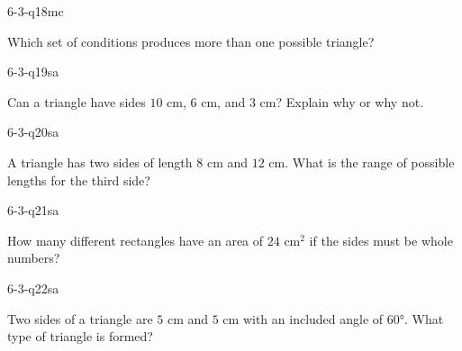\begin{practiceQuestion}{6-3-q18}{mc}
\begin{questionText}
Which set of conditions produces more than one possible triangle?
\end{questionText}
\end{practiceQuestion}


\begin{practiceQuestion}{6-3-q19}{sa}
\begin{questionText}
Can a triangle have sides $10$ cm, $6$ cm, and $3$ cm? Explain why or why not.
\end{questionText}
\end{practiceQuestion}

\begin{practiceQuestion}{6-3-q20}{sa}
\begin{questionText}
A triangle has two sides of length $8$ cm and $12$ cm. What is the range of possible lengths for the third side?
\end{questionText}
\end{practiceQuestion}

\begin{practiceQuestion}{6-3-q21}{sa}
\begin{questionText}
How many different rectangles have an area of $24$ cm$^2$ if the sides must be whole numbers?
\end{questionText}
\end{practiceQuestion}

\begin{practiceQuestion}{6-3-q22}{sa}
\begin{questionText}
Two sides of a triangle are $5$ cm and $5$ cm with an included angle of $60°$. What type of triangle is formed?
\end{questionText}
\end{practiceQuestion}


